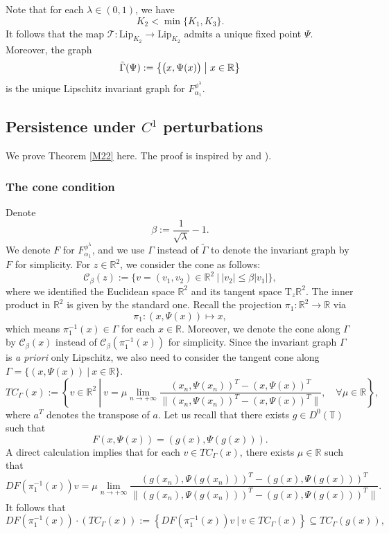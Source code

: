 \documentclass{amsart}
\newcommand{\R}{\mathbb{R}}
\newcommand{\al}{\alpha}
\newcommand{\T}{\mathbb{T}}
\theoremstyle{definition}
\begin{document}
Note that for each $\lambda\in (0,1)$, we have
\[K_2<\min\{K_1,K_3\}.\]
It follows that the map $\mathcal{T} \colon \mathrm{Lip}_{K_2} \to \mathrm{Lip}_{K_2}$ admits a unique fixed point $\Psi$. Moreover, the graph
\begin{equation}\label{tGp}
\tilde{\Gamma}(\Psi) := \bigl\{ \bigl(x, \Psi(x)\bigr) \bigm| x \in \mathbb{R} \bigr\}
\end{equation}
is the unique Lipschitz invariant graph for $F_{\al_1}^{\phi^\lambda}$.


 \vspace{2em}



\subsection{Persistence under $C^1$ perturbations}
We prove Theorem \ref{M22} here. The proof is inspired by \cite[Section 4]{HPS} and \cite[Proof of Theorem 3.1]{BB}).
\subsubsection{The cone condition}
Denote
\[\beta:=\frac{1}{\sqrt{\lambda}}-1.\]
 We denote $F$ for $F_{\al_1}^{\phi^\lambda}$, and we use $\Gamma$ instead of $\tilde{\Gamma}$ to denote the invariant graph by $F$  for simplicity.
For $z\in\R^2$, we consider the cone  as follows:
\[\mathcal{C}_\beta(z):=\{v=(v_1,v_2)\in\R^2\ |\ |v_2|\leq \beta |v_1|\},\]
where we identified the Euclidean space $\R^2$ and its tangent space $\mathrm{T}_z\R^2$. The inner product in $\R^2$ is given by the standard one. Recall the projection $\pi_1:\R^2\to\R$ via
\[\pi_1:(x,\Psi(x))\mapsto x,\]
which means $\pi_1^{-1}(x)\in \Gamma$ for each $x\in\R$. Moreover, we denote the cone along $\Gamma$ by $\mathcal{C}_\beta(x)$ instead of  $\mathcal{C}_\beta(\pi_1^{-1}(x))$ for simplicity. Since the invariant graph $\Gamma$ is {\it a priori} only Lipschitz, we also need to consider the tangent cone along $\Gamma=\{(x,\Psi(x))\ |\ x\in\R\}$.
\[TC_\Gamma(x):=\left\{v\in\R^2\ \left|\ v=\mu\lim_{n\to+\infty}\frac{(x_n,\Psi(x_n))^T-(x,\Psi(x))^T}{\|(x_n,\Psi(x_n))^T-(x,\Psi(x))^T\|}\right.,\quad \forall \mu\in\R\right\},\]
where  $a^T$ denotes the transpose of $a$. Let us recall that there exists $g\in D^0(\T)$ such that
\[F(x,\Psi(x))=(g(x),\Psi(g(x))).\]
A direct calculation implies that for each $v\in TC_\Gamma(x)$, there exists $\mu\in\R$ such that
\[DF(\pi_1^{-1}(x))v=\mu\lim_{n\to+\infty}\frac{(g(x_n),\Psi(g(x_n)))^T-(g(x),\Psi(g(x)))^T}{\|(g(x_n),\Psi(g(x_n)))^T-(g(x),\Psi(g(x)))^T\|}.\]
It follows that
\begin{equation}\label{cooncd}
DF(\pi_1^{-1}(x))\cdot\left(TC_\Gamma(x)\right):=\left\{DF(\pi_1^{-1}(x))v\ |\ v\in TC_\Gamma(x)\right\}\subseteq TC_\Gamma(g(x)),
\end{equation}
\end{document}
